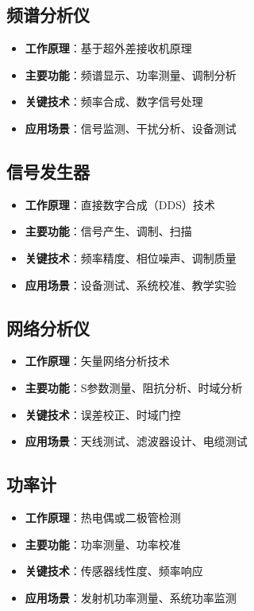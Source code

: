 \documentclass[12pt,UTF8]{ctexbook}
\begin{document}
\subsection{频谱分析仪}

\begin{itemize}[leftmargin=3.5em]
    \item \textbf{工作原理}：基于超外差接收机原理
    \item \textbf{主要功能}：频谱显示、功率测量、调制分析
    \item \textbf{关键技术}：频率合成、数字信号处理
    \item \textbf{应用场景}：信号监测、干扰分析、设备测试
\end{itemize}

\subsection{信号发生器}

\begin{itemize}[leftmargin=3.5em]
    \item \textbf{工作原理}：直接数字合成（DDS）技术
    \item \textbf{主要功能}：信号产生、调制、扫描
    \item \textbf{关键技术}：频率精度、相位噪声、调制质量
    \item \textbf{应用场景}：设备测试、系统校准、教学实验
\end{itemize}

\subsection{网络分析仪}

\begin{itemize}[leftmargin=3.5em]
    \item \textbf{工作原理}：矢量网络分析技术
    \item \textbf{主要功能}：S参数测量、阻抗分析、时域分析
    \item \textbf{关键技术}：误差校正、时域门控
    \item \textbf{应用场景}：天线测试、滤波器设计、电缆测试
\end{itemize}

\subsection{功率计}

\begin{itemize}[leftmargin=3.5em]
    \item \textbf{工作原理}：热电偶或二极管检测
    \item \textbf{主要功能}：功率测量、功率校准
    \item \textbf{关键技术}：传感器线性度、频率响应
    \item \textbf{应用场景}：发射机功率测量、系统功率监测
\end{itemize}
\end{document}
